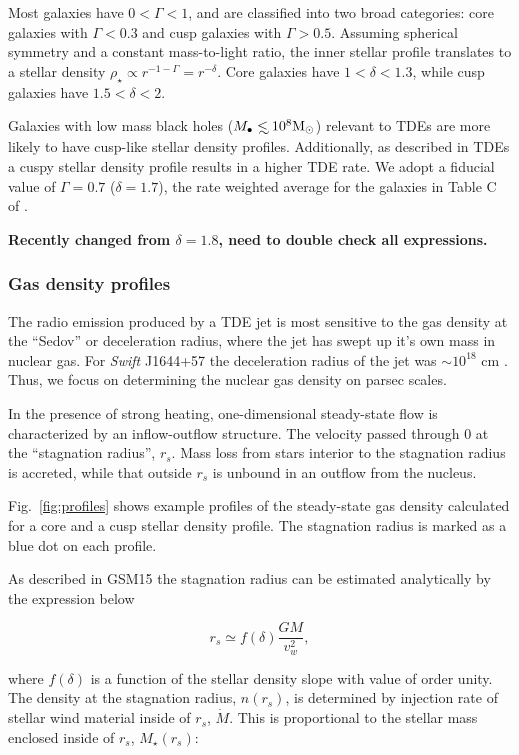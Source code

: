 \documentclass[usenatbib,fleqn]{mnras}
\newcommand\lsim{\mathrel{\rlap{\lower4pt\hbox{\hskip1pt$\sim$}}
    \raise1pt\hbox{$<$}}}
\newcommand{\Mbh}[1][]{M_{\bullet#1}}
\newcommand{\Msun}{{\rm M_\odot}}
\newcommand{\rs}{r_s}
\begin{document}
Most galaxies have $0<\Gamma<1$, and are classified into two broad
categories: core galaxies with $\Gamma<0.3$ and cusp galaxies with
$\Gamma>0.5$. Assuming spherical symmetry and a constant mass-to-light
ratio, the inner stellar profile translates to a stellar density
$\rho_\star\propto r^{-1-\Gamma}=r^{-\delta}$. Core galaxies have
$1<\delta<1.3$, while cusp galaxies have $1.5<\delta<2$.

Galaxies with low mass black holes ($\Mbh\lsim 10^{8} \Msun$) relevant
to TDEs are more likely to have cusp-like stellar density
profiles. Additionally, as described in \citet{Stone&Metzger2016} TDEs
a cuspy stellar density profile results in a higher TDE rate. We adopt
a fiducial value of $\Gamma=0.7$ ($\delta=1.7$), the rate weighted
average for the galaxies in Table C of \citet{Stone&Metzger2016}.

 {\bf Recently changed from $\delta=1.8$, need to
  double check all expressions.}

\subsubsection{Gas density profiles}
The radio emission produced by a TDE jet is most sensitive to the gas
density at the ``Sedov'' or deceleration radius, where the jet has
swept up it's own mass in nuclear gas. For {\it Swift} J1644+57 the
deceleration radius of the jet was $\sim 10^{18}$ cm
\citep{Mimica+2015}. Thus, we focus on determining the nuclear gas
density on parsec scales.

In the presence of strong heating, one-dimensional steady-state flow
is characterized by an inflow-outflow structure. The velocity passed
through 0 at the ``stagnation radius'', $\rs$.  Mass loss from stars
interior to the stagnation radius is accreted, while that outside
$\rs$ is unbound in an outflow from the nucleus. 

Fig.~\ref{fig:profiles} shows example profiles of the steady-state gas
density calculated for a core and a cusp stellar density profile. The
stagnation radius is marked as a blue dot on each profile.

As described in GSM15 the stagnation radius can be estimated
analytically by the expression below

\begin{equation}
r_s \simeq f(\delta) \frac{G M}{v_w^2},
\label{eq:rs}
\end{equation}


\noindent where $f(\delta)$ is a function of the stellar density slope with
value of order unity.  The density at the stagnation radius, $n(\rs)$,
is determined by injection rate of stellar wind material inside of
$\rs$, $\dot{M}$. This is proportional to the stellar mass enclosed
inside of $\rs$, $M_{\star}(\rs)$:
\end{document}

